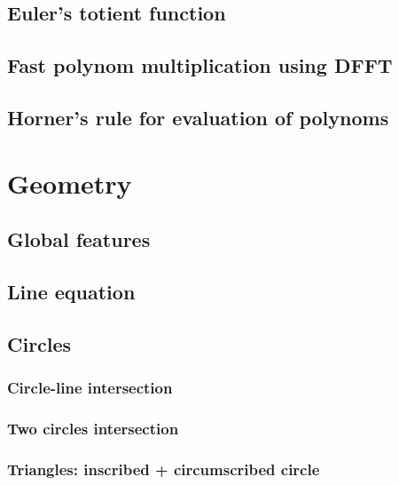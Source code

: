 \documentclass[a4paper]{article}
\begin{document}
\begin{multicols*}{2}
    \subsection{Euler's totient function}
        
    \subsection{Fast polynom multiplication using DFFT}
        
    \subsection{Horner's rule for evaluation of polynoms}
        

\section{Geometry}
    \subsection{Global features}
        
    \subsection{Line equation}
        
    \subsection{Circles}
        \subsubsection{Circle-line intersection}
            
        \subsubsection{Two circles intersection}
            
        \subsubsection{Triangles: inscribed + circumscribed circle}
            

\end{multicols*}
\end{document}
